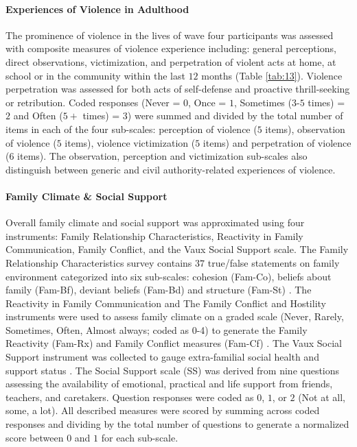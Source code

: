\documentclass[utf8]{article}
\begin{document}
\paragraph{Experiences of Violence in Adulthood} The prominence of violence in the lives of wave four participants was assessed with composite measures of violence experience including: general perceptions, direct observations, victimization, and perpetration of violent acts at home, at school or in the community within the last $12$ months (Table \ref{tab:13}). Violence perpetration was assessed for both acts of self-defense and proactive thrill-seeking or retribution. Coded responses (Never = $0$, Once = $1$, Sometimes ($3$-$5$ times) = $2$ and Often ($5+$ times) = $3$) were summed and divided by the total number of items in each of the four sub-scales: perception of violence ($5$ items), observation of violence ($5$ items), violence victimization ($5$ items) and perpetration of violence ($6$ items). The observation, perception and victimization sub-scales also distinguish between generic and civil authority-related experiences of violence. 
\paragraph{Family Climate \& Social Support}
Overall family climate and social support was approximated using four instruments: Family Relationship Characteristics, Reactivity in Family Communication, Family Conflict, and the Vaux Social Support scale. The Family Relationship Characteristics survey contains $37$ true/false statements on family environment categorized into six sub-scales: cohesion (Fam-Co), beliefs about family (Fam-Bf), deviant beliefs (Fam-Bd) and structure (Fam-St) \citep{tolan1997assessment}. The Reactivity in Family Communication and The Family Conflict and Hostility instruments were used to assess family climate on a graded scale (Never, Rarely, Sometimes, Often, Almost always; coded as 0-4) to generate the Family Reactivity (Fam-Rx) and Family Conflict measures (Fam-Cf) \citep{thornberry2003gangs,henry2004study}. The Vaux Social Support instrument was collected to gauge extra-familial social health and support status \citep{vaux1988social}. The Social Support scale (SS) was derived from nine questions assessing the availability of emotional, practical and life support from friends, teachers, and caretakers. Question responses were coded as $0$, $1$, or $2$ (Not at all, some, a lot). All described measures were scored by summing across coded responses and dividing by the total number of questions to generate a normalized score between $0$ and $1$ for each sub-scale.
\end{document}
